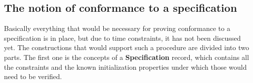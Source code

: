 \begin{code}
    \>[2]\AgdaSpace{}%
    \AgdaSymbol{:}\AgdaSpace{}%
    \AgdaSymbol{(}\AgdaSpace{}%
    \AgdaSpace{}%
    \AgdaSymbol{:}\AgdaSpace{}%
    \AgdaSymbol{)}\AgdaSpace{}%
    \AgdaSpace{}%
    \<%
    \\
    \>[2]\AgdaSpace{}%
    \AgdaSpace{}%
    \AgdaSpace{}%
    \AgdaSymbol{=}\AgdaSpace{}%
    \AgdaSymbol{(}\AgdaSpace{}%
    \AgdaOperator{\AgdaFunction{++}}\AgdaSpace{}%
    \AgdaSymbol{)}\<%
    \\
    \\[\AgdaEmptyExtraSkip]%
    \>[2]\AgdaSpace{}%
    \AgdaSpace{}%
    \<%
    \\
    \>[2]\AgdaSpace{}%
    \AgdaSymbol{:}\AgdaSpace{}%
    \AgdaSymbol{(}\AgdaSpace{}%
    \AgdaSpace{}%
    \AgdaSymbol{:}\AgdaSpace{}%
    \AgdaSymbol{)}\AgdaSpace{}%
    \AgdaSpace{}%
    \<%
    \\
    \>[2]\AgdaSpace{}%
    \AgdaSpace{}%
    \AgdaSpace{}%
    \AgdaSymbol{=}\AgdaSpace{}%
    \AgdaSpace{}%
    \AgdaSpace{}%
    \<%
\end{code}

\subsection{The notion of conformance to a specification}

Basically everything that would be necessary for proving conformance to a specification is in place, but due to time constraints, it has not been discussed yet. The constructions that would support such a procedure are divided into two parts. The first one is the concepts of a \textbf{Specification} record, which contains all the constraints and the known initialization properties under which those would need to be verified.


